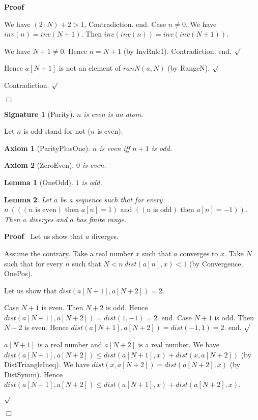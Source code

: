 \documentclass{article}
\newenvironment{forthel}{\begin{leftbar}}{\end{leftbar}}
\newenvironment{proof}{\noindent\textbf{Proof\ }}{\hspace*{\fill}$\Box$\medskip}
\newenvironment{subproof}{\begin{list}{}{}
		\item[\text{Proof}]}{\hfill $\surd$ \end{list}}
\newtheorem{axiom}{Axiom}
\newtheorem{lemma}{Lemma}
\newtheorem{signature}{Signature}
\begin{document}
\begin{forthel}
\begin{proof}
\begin{subproof}
\begin{subproof}
\begin{subproof}
	We have $(2 \cdot N) + 2 > 1$.
	Contradiction.
	end.
	Case $n \neq 0$.
	We have $inv(n) = inv(N + 1)$.
	Then $inv(inv(n)) = inv(inv(N + 1))$.
	
	We have $N + 1 \neq 0$.
	Hence $n = N + 1$ (by InvRule1).
	Contradiction.
	end.
	\end{subproof}
	Hence $a[N + 1]$ is not an element of $ranN(a,N)$ (by RangeN).
	\end{subproof}
	
	Contradiction.
	\end{subproof}
	\end{proof}
	
	\begin{signature} [Parity]
	$n$ is even is an atom.
	\end{signature}
	
	\noindent Let $n$ is odd stand for not ($n$ is even).
	
	\begin{axiom} [ParityPlusOne]
	$n$ is even iff $n + 1$ is odd.
	\end{axiom}

	\begin{axiom} [ZeroEven]
	$0$ is even.
	\end{axiom}
	
	\begin{lemma} [OneOdd]
	$1$ is odd.
	\end{lemma} 
	
	\begin{lemma}
	Let $a$ be a sequence such that for every $n \ (((n \text{ is even}) \text{ then } a[n] = 1) \text{ and } ((\text{n is odd}) \text{ then } a[n] = -1))$.
	Then $a$ diverges and $a$ has finite range.
	\end{lemma}
	\begin{proof}
	Let us show that $a$ diverges.
	\begin{subproof}
	Assume the contrary.
	Take a real number $x$ such that $a$ converges to $x$.
	Take $N$ such that for every $n$ such that $N < n \ dist(a[n],x) < 1$ (by Convergence, OnePos).
	
	Let us show that $dist(a[N + 1],a[N + 2]) = 2$.
	\begin{subproof}
	Case $N + 1$ is even.
	Then $N + 2$ is odd.
	Hence $dist(a[N + 1],a[N + 2]) = dist(1,-1) = 2$.
	end.
	Case $N + 1$ is odd.
	Then $N + 2$ is even.
	Hence $dist(a[N + 1],a[N + 2]) = dist(-1,1) = 2$.
	end.
	\end{subproof}
	
	$a[N + 1]$ is a real number and $a[N + 2]$ is a real number.
	We have $dist(a[N + 1],a[N + 2]) \leq dist(a[N + 1],x) + dist(x,a[N + 2])$ (by DistTriangleIneq).
	We have $dist(x,a[N + 2]) = dist(a[N + 2],x)$ (by DistSymm).
	Hence $dist(a[N + 1],a[N + 2]) \leq dist(a[N + 1],x) + dist(a[N + 2],x)$.
	

\end{subproof}
\end{proof}
\end{forthel}
\end{document}
